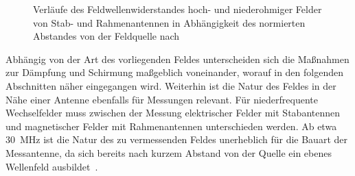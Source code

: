 \begin{figure}[ht]
    \centering
    \caption[Verläufe des Feldwellenwiderstandes hoch- und niederohmiger Felder von Stab- und Rahmenantennen in Abhängigkeit des normierten Abstandes von der Feldquelle]{Verläufe des Feldwellenwiderstandes hoch- und niederohmiger Felder von Stab- und Rahmenantennen in Abhängigkeit des normierten Abstandes von der Feldquelle nach~\cite{EMV}}
    \label{fig:2_Feldwellenwiderstand}
\end{figure}


Abhängig von der Art des vorliegenden Feldes unterscheiden sich die Maßnahmen zur Dämpfung und Schirmung maßgeblich voneinander, worauf in den folgenden Abschnitten näher eingegangen wird. Weiterhin ist die Natur des Feldes in der Nähe einer Antenne ebenfalls für Messungen relevant. Für niederfrequente Wechselfelder muss zwischen der Messung elektrischer Felder mit Stabantennen und magnetischer Felder mit Rahmenantennen unterschieden werden. Ab etwa \SI{30}{\mega\hertz} ist die Natur des zu vermessenden Feldes unerheblich für die Bauart der Messantenne, da sich bereits nach kurzem Abstand von der Quelle ein ebenes Wellenfeld ausbildet~\cite{Design_of_shielded_enclosures}.



